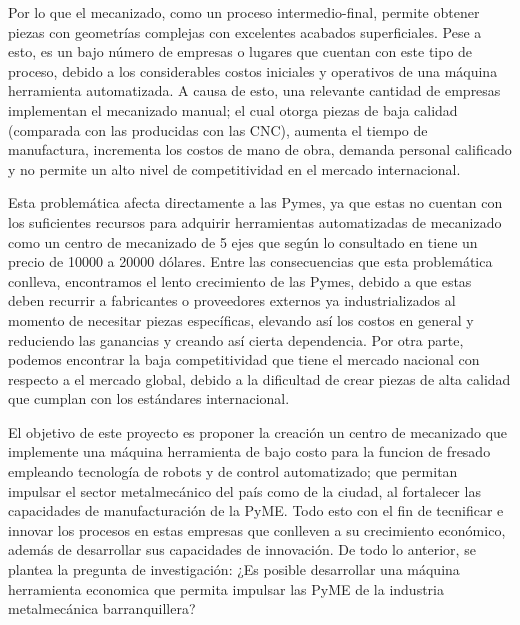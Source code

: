     Por lo que el mecanizado, como un proceso intermedio-final, permite obtener piezas con geometrías complejas con excelentes acabados superficiales. Pese a esto, es un bajo número de empresas o lugares que cuentan con este tipo de proceso, debido a los considerables costos iniciales y operativos de una máquina herramienta automatizada. A causa de esto, una relevante cantidad de empresas implementan el mecanizado manual; el cual otorga piezas de baja calidad (comparada con las producidas con las CNC), aumenta el tiempo de manufactura, incrementa los costos de mano de obra, demanda personal calificado y no permite un alto nivel de competitividad en el mercado internacional.
    
    Esta problemática afecta directamente a las Pymes, ya que estas no cuentan con los suficientes recursos para adquirir herramientas automatizadas de mecanizado como un centro de mecanizado de 5 ejes que según lo consultado en \citep{Alibaba2019} tiene un precio de 10000 a 20000 dólares.  Entre las consecuencias que esta problemática conlleva, encontramos el lento crecimiento de las Pymes, debido a que estas deben recurrir a fabricantes o proveedores externos ya industrializados al momento de necesitar piezas específicas, elevando así los costos en general y reduciendo las ganancias y creando así cierta dependencia. Por otra parte, podemos encontrar la baja competitividad que tiene el mercado nacional con respecto a el mercado global, debido a la dificultad de crear piezas de alta calidad que cumplan con los estándares internacional.
    
    El objetivo de este proyecto es proponer la creación un centro de mecanizado que implemente una máquina herramienta de bajo costo para la funcion de fresado empleando tecnología de robots y de control automatizado; que permitan impulsar el sector metalmecánico del país como de la ciudad, al fortalecer las capacidades de manufacturación de la PyME. Todo esto con el fin de tecnificar e innovar los procesos en estas empresas que conlleven a su crecimiento económico, además de desarrollar sus capacidades de innovación. De todo lo anterior, se plantea la pregunta de investigación: ¿Es posible desarrollar una máquina herramienta economica que permita impulsar las PyME de la industria metalmecánica barranquillera?
 \newpage
 
